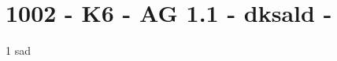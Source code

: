 \section{1002 - K6 - AG 1.1 - dksald  - }

\begin{langesbeispiel} \item[1] %
sad
\end{langesbeispiel}